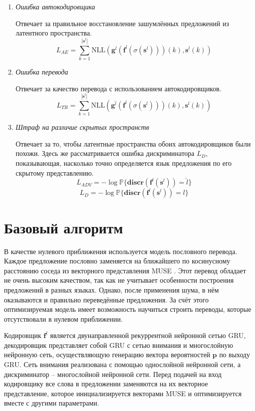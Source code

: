 \documentclass[12pt,twoside]{article}
\begin{document}
 \begin{enumerate}
 	\item \textit{Ошибка автокодировщика}
 	
 	Отвечает за правильное восстановление зашумлённых предложений из латентного пространства.
 	\[ L_{AE} = \sum_{k=1}^{|\mathbf{s}^l|}\text{NLL}(\mathbf{g}^l(\mathbf{f}^l(\sigma(\mathbf{s}^l)))(k), \mathbf{s}^l(k)) \]
 	
 	\item \textit{Ошибка перевода}
 	
 	Отвечает за качество перевода с использованием автокодировщиков.
 	\[ L_{TR} = \sum_{k=1}^{|\mathbf{s}^l|}\text{NLL}(\mathbf{g}^{\widehat{l}}(\mathbf{f}^l(\sigma(\mathbf{s}^l)))(k), \mathbf{s}^l(k)) \]
 	
 	\item \textit{Штраф на различие скрытых пространств}
 	
 	Отвечает за то, чтобы латентные пространства обоих автокодировщиков были похожи. Здесь же рассматривается ошибка дискриминатора $L_D$, показывающая, насколько точно определяется язык предложения по его скрытому представлению.
 	\[ L_{ADV} = -\log \mathbb{P}\{\mathbf{discr}(\mathbf{f}^l(\mathbf{s}^l)) = \widehat{l}\}\]
 	\[ L_{D}   = -\log \mathbb{P}\{\mathbf{discr}(\mathbf{f}^l(\mathbf{s}^l)) = l\}\]
 \end{enumerate}

\section{Базовый алгоритм}

В качестве нулевого приближения используется модель пословного перевода. Каждое предложение пословно заменяется на ближайшего по косинусному расстоянию соседа из векторного представления MUSE \cite{conneau2017word}. Этот перевод обладает не очень высоким качеством, так как не учитывает особенности построения предложений в разных языках. Однако, после применения шума, в нём оказываются и правильно переведённые предложения. За счёт этого оптимизируемая модель имеет возможность научиться строить переводы, которые отсутствовали в нулевом приближении. 

Кодировщик $\mathbf{f}^l$ является двунаправленной рекуррентной нейронной сетью GRU, декодировщик представляет собой GRU с сетью внимания и многослойную нейронную сеть, осуществляющую генерацию вектора вероятностей $\mathbf{p}$ по выходу GRU. Сеть внимания реализована с помощью однослойной нейронной сети, а дискриминатор -- многослойной нейронной сети. Перед подачей на вход кодировщику все слова в предложении заменяются на их векторное представление, которое инициализируется векторами MUSE и оптимизируется вместе с другими параметрами.
\end{document}
